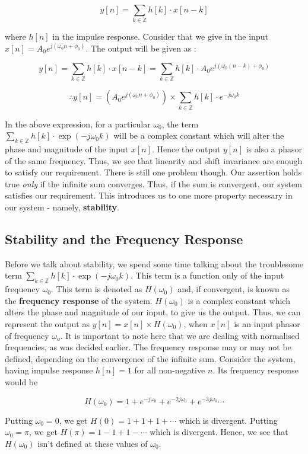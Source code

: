 \documentclass{article}
\theoremstyle{definition}
\begin{document}
\[
	y[n] = \sum_{k \in \mathbb{Z}} h[k]\cdot x[n-k]
\]

where $h[n]$ in the impulse response. Consider that we give in the input $x[n] = A_0 e^{j(\omega_0 n + \phi_0)}$. The output will be given as :

\[
	y[n] = \sum_{k \in \mathbb{Z}} h[k]\cdot x[n-k] = \sum_{k \in \mathbb{Z}} h[k] \cdot A_0 e^{j(\omega_0 (n-k) + \phi_0)}
\]

\[
	\therefore \boxed{y[n] = \left(A_0 e^{j(\omega_0 n + \phi_0)}\right) \times \sum_{k \in \mathbb{Z}} h[k] \cdot e^{-j\omega_0 k} }
\]

In the above expression, for a particular $\omega_0$, the term $\sum_{k \in \mathbb{Z}} h[k] \cdot \exp(-j\omega_0 k)$ will be a complex constant which will alter the phase and magnitude of the input $x[n]$. Hence the output $y[n]$ is also a phasor of the same frequency. Thus, we see that linearity and shift invariance are enough to satisfy our requirement. There is still one problem though. Our assertion holds true \textit{only} if the infinite sum converges. Thus, if the sum is convergent, our system satisfies our requirement. This introduces us to one more property necessary in our system - namely, \textbf{stability}.

\subsection{Stability and the Frequency Response} 

Before we talk about stability, we spend some time talking about the troublesome term $\sum_{k \in \mathbb{Z}} h[k] \cdot \exp(-j\omega_0 k)$. This term is a function only of the input frequency $\omega_0$. This term is denoted as $H(\omega_0)$ and, if convergent, is known as the \textbf{frequency response} of the system. $H(\omega_0)$ is a complex constant which alters the phase and magnitude of our input, to give us the output. Thus, we can represent the output as $y[n] = x[n] \times H(\omega_0)$, when $x[n]$ is an input phasor of frequency $\omega_o$. It is important to note here that we are dealing with normalised frequencies, as was decided earlier. The frequency response may or may not be defined, depending on the convergence of the infinite sum. Consider the system, having impulse response $h[n] = 1$ for all non-negative $n$. Its frequency response would be 

\[
	H(\omega_0) = 1 + e^{-j\omega_0} + e^{-2j\omega_0} + e^{-3j\omega_0} \cdots 
\]

Putting $\omega_0 = 0$, we get $H(0) = 1 + 1 + 1 + \cdots$ which is divergent. Putting $\omega_0 = \pi$, we get $H(\pi) = 1 - 1 + 1 - \cdots$ which is divergent. Hence, we see that $H(\omega_0)$ isn't defined at these values of $\omega_0$. \smallskip
\end{document}
